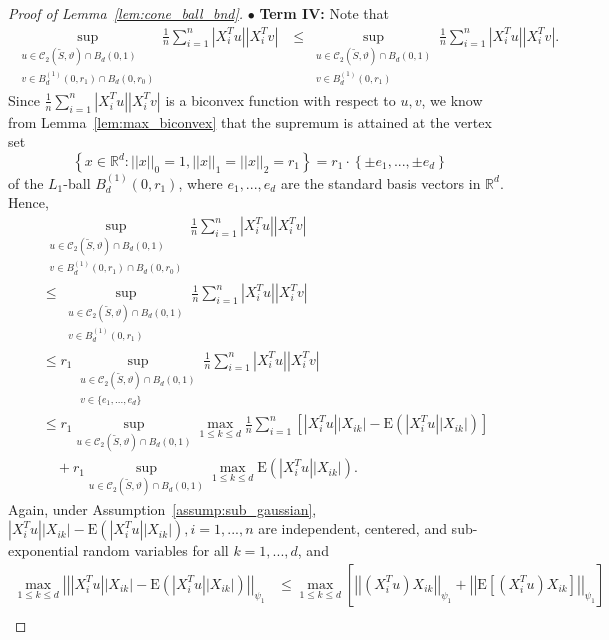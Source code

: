 \documentclass[ejsv2,noshowframe]{imsart}
\theoremstyle{plain}
\theoremstyle{definition}
\theoremstyle{remark}
\newcommand{\norm}[1]{\left|\left| #1 \right|\right|}
\renewcommand{\tilde}{\widetilde}
\begin{document}
\begin{proof}[Proof of Lemma~\ref{lem:cone_ball_bnd}]
	$\bullet$ {\bf Term IV:} Note that 
	\begin{align*}
		\sup_{\substack{u \in \mathcal{C}_2(\tilde{S},\vartheta) \cap B_d(0,1)\\v\in B_d^{(1)}(0,r_1) \cap B_d(0,r_0)}} \frac{1}{n} \sum_{i=1}^n \left|X_i^Tu\right| \left|X_i^Tv\right| &\leq \sup_{\substack{u \in \mathcal{C}_2(\tilde{S},\vartheta) \cap B_d(0,1)\\v\in B_d^{(1)}(0,r_1)}} \frac{1}{n} \sum_{i=1}^n \left|X_i^Tu\right| \left|X_i^Tv\right|.
	\end{align*}
	Since $\frac{1}{n} \sum_{i=1}^n \left|X_i^Tu\right| \left|X_i^Tv\right|$ is a biconvex function with respect to $u,v$, we know from Lemma~\ref{lem:max_biconvex} that the supremum is attained at the vertex set 
	$$\left\{x\in \mathbb{R}^d: \norm{x}_0=1, \norm{x}_1=\norm{x}_2=r_1 \right\} = r_1 \cdot \left\{\pm e_1,...,\pm e_d\right\}$$ 
	of the $L_1$-ball $B_d^{(1)}(0,r_1)$, where $e_1,...,e_d$ are the standard basis vectors in $\mathbb{R}^d$. Hence,
	\begin{align*}
		&\sup_{\substack{u \in \mathcal{C}_2(\tilde{S},\vartheta) \cap B_d(0,1)\\v\in B_d^{(1)}(0,r_1) \cap B_d(0,r_0)}} \frac{1}{n} \sum_{i=1}^n \left|X_i^Tu\right| \left|X_i^Tv\right| \\
		&\leq \sup_{\substack{u \in \mathcal{C}_2(\tilde{S},\vartheta) \cap B_d(0,1)\\v\in B_d^{(1)}(0,r_1)}} \frac{1}{n} \sum_{i=1}^n \left|X_i^Tu\right| \left|X_i^Tv\right| \\
		&\leq r_1 \sup_{\substack{u \in \mathcal{C}_2(\tilde{S},\vartheta) \cap B_d(0,1)\\v\in \{e_1,...,e_d\}}} \frac{1}{n} \sum_{i=1}^n \left|X_i^Tu\right| \left|X_i^Tv\right| \\
		&\leq r_1 \sup_{u \in \mathcal{C}_2(\tilde{S},\vartheta) \cap B_d(0,1)} \max_{1\leq k \leq d} \frac{1}{n} \sum_{i=1}^n \left[|X_i^Tu| |X_{ik}| - \mathrm{E}\left(|X_i^Tu| |X_{ik}|\right) \right] \\
		&\quad + r_1 \sup_{u \in \mathcal{C}_2(\tilde{S},\vartheta) \cap B_d(0,1)} \max_{1\leq k \leq d} \mathrm{E}\left(|X_i^Tu| |X_{ik}|\right).
	\end{align*}
	Again, under Assumption~\ref{assump:sub_gaussian}, $|X_i^Tu| |X_{ik}| - \mathrm{E}\left(|X_i^Tu| |X_{ik}|\right),i=1,...,n$ are independent, centered, and sub-exponential random variables for all $k=1,...,d$, and
	\begin{align*}
		\max_{1\leq k \leq d}\norm{|X_i^Tu| |X_{ik}| - \mathrm{E}\left(|X_i^Tu| |X_{ik}|\right)}_{\psi_1} &\leq \max_{1\leq k \leq d} \left[\norm{(X_i^Tu) X_{ik}}_{\psi_1} + \norm{\mathrm{E}\left[(X_i^Tu) X_{ik}\right]}_{\psi_1} \right]\\

\end{align*}
\end{proof}
\end{document}
